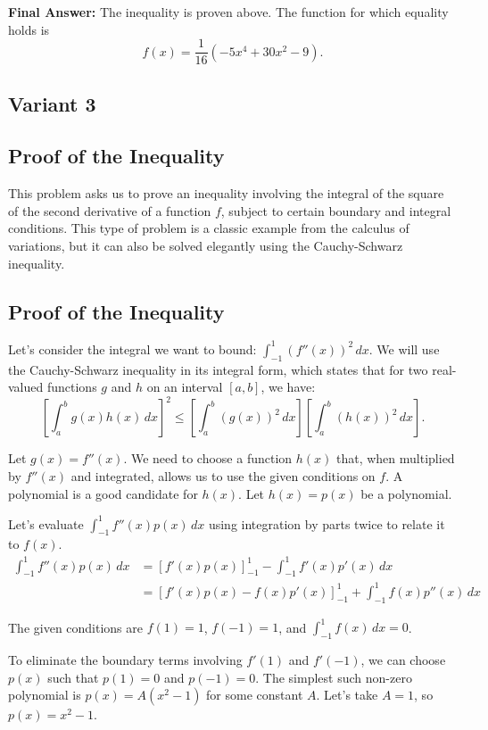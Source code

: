 \documentclass[12pt,a4paper]{article}
\theoremstyle{definition}
\begin{document}
    \textbf{Final Answer:}
    The inequality is proven above. The function for which equality holds is
    \[ f(x) = \frac{1}{16}(-5x^4 + 30x^2 - 9). \]

\subsection{Variant 3}
\subsection*{Proof of the Inequality}

This problem asks us to prove an inequality involving the integral of the square of the second derivative of a function $f$, subject to certain boundary and integral conditions. This type of problem is a classic example from the calculus of variations, but it can also be solved elegantly using the Cauchy-Schwarz inequality.

\subsection*{Proof of the Inequality}

Let's consider the integral we want to bound: $\int_{-1}^{1} (f''(x))^2 \, dx$. We will use the Cauchy-Schwarz inequality in its integral form, which states that for two real-valued functions $g$ and $h$ on an interval $[a, b]$, we have:
\[
\left[\int_a^b g(x)h(x) \, dx\right]^2 \leq \left[\int_a^b (g(x))^2 \, dx\right] \left[\int_a^b (h(x))^2 \, dx\right].
\]

Let $g(x) = f''(x)$. We need to choose a function $h(x)$ that, when multiplied by $f''(x)$ and integrated, allows us to use the given conditions on $f$. A polynomial is a good candidate for $h(x)$. Let $h(x) = p(x)$ be a polynomial.

Let's evaluate $\int_{-1}^{1} f''(x)p(x) \, dx$ using integration by parts twice to relate it to $f(x)$.
\begin{align}
\int_{-1}^{1} f''(x)p(x) \, dx &= [f'(x)p(x)]_{-1}^{1} - \int_{-1}^{1} f'(x)p'(x) \, dx \\
&= [f'(x)p(x) - f(x)p'(x)]_{-1}^{1} + \int_{-1}^{1} f(x)p''(x) \, dx
\end{align}

The given conditions are $f(1) = 1$, $f(-1) = 1$, and $\int_{-1}^{1} f(x) \, dx = 0$.

To eliminate the boundary terms involving $f'(1)$ and $f'(-1)$, we can choose $p(x)$ such that $p(1) = 0$ and $p(-1) = 0$. The simplest such non-zero polynomial is $p(x) = A(x^2 - 1)$ for some constant $A$. Let's take $A=1$, so $p(x) = x^2 - 1$.
\end{document}
